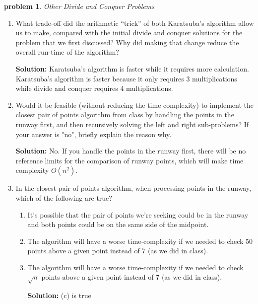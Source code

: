 \documentclass[10pt]{article}
\newtheorem{problem}{\sc\color{cit}problem}
\begin{document}
\begin{problem} Other Divide and Conquer Problems \end{problem}

    \begin{enumerate}   
    	\item What trade-off did the arithmetic “trick” of both Karatsuba's algorithm allow us to make, compared with the initial divide and conquer solutions for the problem that we first discussed? Why did making that change reduce the overall run-time of the algorithm?
    	
    	\textbf{Solution:}  Karatsuba's algorithm is faster while it requires more calculation. Karatsuba's algorithm is faster because it only requires 3 multiplications while divide and conquer requires 4 multiplications.

        \item Would it be feasible (without reducing the time complexity) to implement the closest pair of points algorithm from class by handling the points in the runway first, and then recursively solving the left and right sub-problems?  If your answer is "no", briefly explain the reason why.
        
        \textbf{Solution:}  No. If you handle the points in the runway first, there will be no reference limits for the comparison of runway points, which will make time complexity $O(n^2)$. 

        \item In the closest pair of points algorithm, when processing points in the runway, which of the following are true?
    		\begin{enumerate} 
    		\item It's possible that the pair of points we're seeking could be in the runway and both points could be on the same side of the midpoint.
   		    \item The algorithm will have a worse time-complexity if we needed to check 50 points above a given point instead of 7 (as we did in class).
       		\item The algorithm will have a worse time-complexity if we needed to check $\sqrt{n}$ points above a given point instead of 7 (as we did in class).
       	
       	\textbf{Solution:}  (c) is true
       	
    		\end{enumerate} 
    \end{enumerate} 
\end{document}
